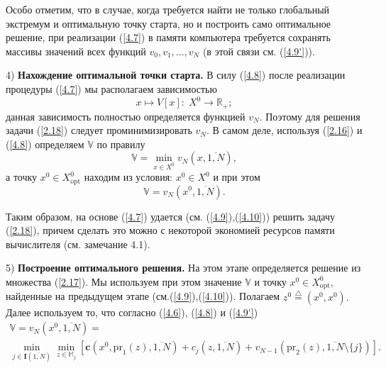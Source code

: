 \documentclass[10pt]{SPIIRAS_Proceedings}
\begin{document}
Особо отметим, что в случае, когда требуется найти не только глобальный экстремум и оптимальную точку старта,
но и построить само оптимальное решение, при реализации (\ref{4.7})
в памяти компьютера требуется сохранять массивы значений всех функций
$v_0,v_1,...,v_N$
(в этой связи см. (\ref{4.9'})).

4) {\bf Нахождение оптимальной точки старта.}
В силу (\ref{4.8}) после реализации процедуры (\ref{4.7}) мы располагаем зависимостью
$$
  x \longmapsto V[x]:\;X^0 \longrightarrow \mathbb{R}_+;
$$
данная зависимость полностью определяется функцией $v_N.$
Поэтому для решения задачи (\ref{2.18}) следует проминимизировать
$v_N.$
В самом деле, используя (\ref{2.16}) и (\ref{4.8}) определяем
$\mathbb{V}$ по правилу
\begin{equation}\label{4.9}
  \mathbb{V} = \min\limits_{x \in X^0} v_N(x,\overline{1,N}),
\end{equation}
а точку
$x^0 \in X^0_{\mathrm{opt}}$
находим из условия:
$x^0 \in X^0$ и при этом
\begin{equation}\label{4.10}
  \mathbb{V} = v_N(x^0,\overline{1,N}).
\end{equation}

Таким образом, на основе (\ref{4.7}) удается
(см. (\ref{4.9}),(\ref{4.10})) решить задачу (\ref{2.18}),
причем сделать это можно с некоторой экономией ресурсов памяти вычислителя
(см. замечание 4.1).

5) {\bf Построение оптимального решения.}
На этом этапе определяется решение из множества (\ref{2.17}).
Мы используем при этом значение
$\mathbb{V}$ и точку
$x^0 \in X^0_{\mathrm{opt}},$
найденные на предыдущем этапе (см.(\ref{4.9}),(\ref{4.10})).
Полагаем $z^0 \stackrel{\triangle}{=} (x^0,x^0).$
Далее используем то, что согласно (\ref{4.6}), (\ref{4.8}) и (\ref{4.9'})
\begin{multline}
  \label{4.11}
  \mathbb{V} = v_N(x^0,\overline{1,N}) = \\
  \min\limits_{j \in \mathbf{I}(\overline{1,N})}
  \min\limits_{z \in \mathbb{M}_j}
  [\mathbf{c}(x^0,\mathrm{pr}_1(z),\overline{1,N}) + c_j(z,\overline{1,N}) + v_{N-1}(\mathrm{pr}_2(z),\overline{1,N} \setminus \{j\})].
\end{multline}
\end{document}

